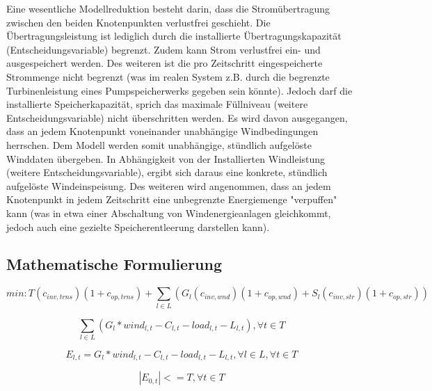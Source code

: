 Eine wesentliche Modellreduktion besteht darin, dass die Stromübertragung zwischen den beiden Knotenpunkten verlustfrei geschieht. Die Übertragungsleistung ist lediglich durch die installierte Übertragungskapazität (Entscheidungsvariable) begrenzt. Zudem kann Strom verlustfrei ein- und ausgespeichert werden. Des weiteren ist die pro Zeitschritt eingespeicherte Strommenge nicht begrenzt (was im realen System z.B. durch die begrenzte Turbinenleistung eines Pumpspeicherwerks gegeben sein könnte). Jedoch darf die installierte Speicherkapazität, sprich das maximale Füllniveau (weitere Entscheidungsvariable) nicht überschritten werden. Es wird davon ausgegangen, dass an jedem Knotenpunkt voneinander unabhängige Windbedingungen herrschen. Dem Modell werden somit unabhängige, stündlich aufgelöste Winddaten übergeben. In Abhängigkeit von der Installierten Windleistung (weitere Entscheidungsvariable), ergibt sich daraus eine konkrete, stündlich aufgelöste Windeinspeisung. Des weiteren wird angenommen, dass an jedem Knotenpunkt in jedem Zeitschritt eine unbegrenzte Energiemenge "verpuffen" kann (was in etwa einer Abschaltung von Windenergieanlagen gleichkommt, jedoch auch eine gezielte Speicherentleerung darstellen kann).

\subsection{Mathematische Formulierung} \label{str:mathematisch}

\begin{equation}
min: T (c_{inv, trns})(1 + c_{op, trns}) + \sum \limits_{l \in L} ( G_{l} (c_{inv, wnd})(1 + c_{op, wnd}) + S_{l} (c_{inv, str})(1 + c_{op, str})) 
\label{fml:zielfunktion}
\end{equation}

\begin{equation}
\sum \limits_{l \in L} (G_{l} * wind_{l, t} - C_{l, t} - load_{l, t} - L_{l, t}), \forall t \in T
\label{fml:constr1}
\end{equation}

\begin{equation}
E_{l, t} = G_{l} * wind_{l, t} - C_{l, t} - load_{l, t} - L_{l, t}, \forall l \in L, \forall t \in T
\label{fml:constr2}
\end{equation}

\begin{equation}
|E_{0, t}| <= T , \forall t \in T
\label{fml:constr3}
\end{equation}

